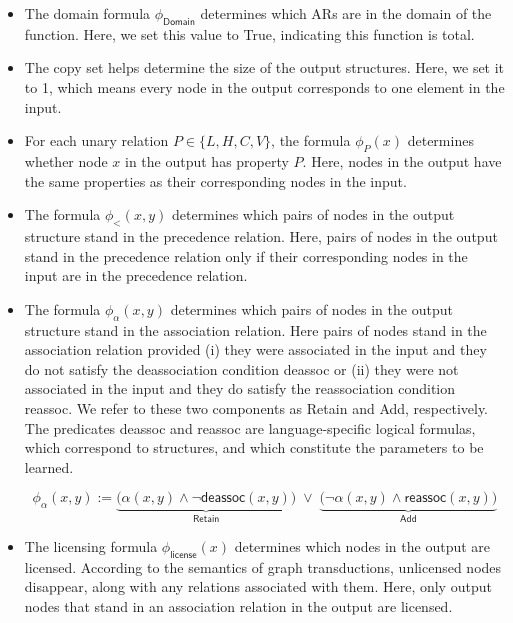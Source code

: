 \documentclass[pmlr]{jmlr}%
\newcommand{\hijeff}[1]{%
	\textcolor{violet}{\textbf{[#1]}}%
}
\newcommand{\hihan}[1]{%
	\textcolor{orange}{\textbf{[#1]}}%
}
\begin{document}
	\begin{itemize}\itemsep-0.5ex
		\item The domain formula $\phi_{\textsf{Domain}}$ determines
		which ARs are in the domain of the function.
		Here, we set this value to True, indicating this function is total.
		\item The copy set helps determine the size of the output structures.
		Here, we set it to 1, which means every node in the output
		corresponds to one element in the input. 
		\item For each unary relation $P\in\{L, H, C, V\}$, the formula \(\phi_{P}(x)\)
		determines whether node \(x\) in the output has property \(P\).
		Here, nodes in the output have the same properties
		as their corresponding nodes in the input.
		\item The formula  \(\phi_{<}(x,y)\) determines which pairs of nodes
		in the output structure stand in the precedence relation.
		Here, pairs of nodes in the output stand in the precedence relation
		only if their corresponding nodes in the input are in the precedence relation.
		\item The formula  \(\phi_{\alpha}(x,y)\) determines which pairs of nodes
		in the output structure stand in the association relation.
		Here pairs of nodes stand in the association relation provided
		(i) they were associated in the input and they do not satisfy
		the deassociation condition \textsf{deassoc} or 
		(ii) they were not associated in the input and they do satisfy
		the reassociation condition \textsf{reassoc}.
		We refer to these two components as \textsf{Retain} and \textsf{Add}, 
		respectively. The predicates \textsf{deassoc} and \textsf{reassoc} are 
		language-specific logical formulas, which correspond to structures,
		and which constitute the parameters to be learned.
		
		\begin{equation}
			\phi_{\alpha}(x,y) :=
			\underbrace{\bigl(\alpha(x,y) \land \neg \textsf{deassoc}(x,y)\bigr)}_{\textsf{Retain}}
			\;\lor\;
			\underbrace{\bigl(\neg \alpha(x,y) \land \textsf{reassoc}(x,y)\bigr)}_{\textsf{Add}}
			\label{eq:retainadd}
		\end{equation}
		
		\item The licensing formula $\phi_{\textsf{license}}(x)$
		determines which nodes in the output are licensed.
		According to the semantics of graph transductions,
		unlicensed nodes disappear,
		along with any relations associated with them.
		Here, only output nodes that stand
		in an association relation in the output are licensed.
		
	\end{itemize}
	
\end{document}
